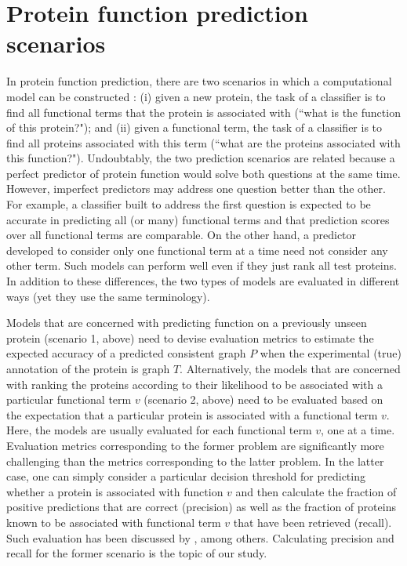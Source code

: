 

\section{Protein function prediction scenarios}

In protein function prediction, there are two scenarios in which a computational model can be constructed \citep{Radivojac2013}: (i) given a new protein, the task of a classifier is to find all functional terms that the protein is associated with (``what is the function of this protein?"); and (ii) given a functional term, the task of a classifier is to find all proteins associated with this term (``what are the proteins associated with this function?"). Undoubtably, the two prediction scenarios are related because a perfect predictor of protein function would solve both questions at the same time. However, imperfect predictors may address one question better than the other. For example, a classifier built to address the first question is expected to be accurate in predicting all (or many) functional terms and that prediction scores over all functional terms are comparable. On the other hand, a predictor developed to consider only one functional term at a time need not consider any other term. Such models can perform well even if they just rank all test proteins. In addition to these differences, the two types of models are evaluated in different ways (yet they use the same terminology).

Models that are concerned with predicting function on a previously unseen protein (scenario 1, above) need to devise evaluation metrics to estimate the expected accuracy of a predicted consistent graph $P$ when the experimental (true) annotation of the protein is graph $T$. Alternatively, the models that are concerned with ranking the proteins according to their likelihood to be associated with a particular functional term $v$ (scenario 2, above) need to be evaluated based on the expectation that a particular protein is associated with a functional term $v$. Here, the models are usually evaluated for each functional term $v$, one at a time. Evaluation metrics corresponding to the former problem are significantly more challenging than the metrics corresponding to the latter problem. In the latter case, one can simply consider a particular decision threshold for predicting whether a protein is associated with function $v$ and then calculate the fraction of positive predictions that are correct (precision) as well as the fraction of proteins known to be associated with functional term $v$ that have been retrieved (recall). Such evaluation has been discussed by \citet{Sharan2007}, among others. Calculating precision and recall for the former scenario is the topic of our study.


